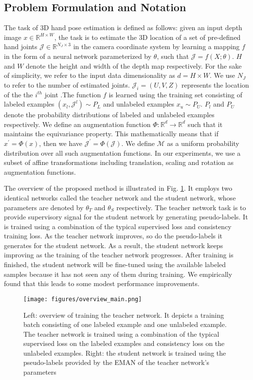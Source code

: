\documentclass{article}
\begin{document}
\subsection{Problem Formulation and Notation}
The task of 3D hand pose estimation is defined as follows: given an input depth image $x\in{\mathbb{R}^{H\times{W}}}$, the task is to estimate the 3D location of a set of pre-defined hand joints $\mathcal{J}\in{\mathbb{R}^{N_J\times{3}}}$ in the camera coordinate system by learning a mapping $f$ in the form of a neural network parameterized by $\theta$, such that $\mathcal{J} = f(X ;\theta)$. $H$ and $W$ denote the height and width of the depth map respectively. For the sake of simplicity, we refer to the input data dimensionality as $d = H\times{W}$. We use $N_J$ to refer to the number of estimated joints. $\mathcal{J}_i = (U,V,Z)$ represents the location of the the $i^{th}$ joint .The function $f$ is learned using the training set consisting of labeled examples $(x_l, \mathcal{J}^l) \sim P_L$  and unlabeled examples $x_u \sim P_U$. $P_l$ and $P_U$ denote the probability distributions of labeled and unlabeled examples respectively. We define an augmentation function $\Phi: \mathbb{R}^{d} \rightarrow{\mathbb{R}^{d}}$ such that it maintains the equivariance property. This mathematically means that if $x^{\prime} = \Phi(x)$, then we have $\mathcal{J}^{\prime} = \Phi(\mathcal{J})$. We define $\mathcal{M}$ as a uniform probability distribution over all such augmentation functions. In our experiments, we use a subset of affine transformations including translation, scaling and rotation as augmentation functions. 
\par
The overview of the proposed method is illustrated in Fig. \ref{fig:overview}. It employs two identical networks called the teacher network and the student network, whose parameters are denoted by $\theta_T$ and $\theta_S$ respectively. The teacher network task is to provide supervisory signal for the student network by generating pseudo-labels. It is trained using a combination of the typical supervised loss and consistency training loss. As the teacher network improves, so do the pseudo-labels it generates for the student network. As a result, the student network keeps improving as the training of the teacher network progresses. After training is finished, the student network will be fine-tuned using the available labeled samples because it has not seen any of them during training. We empirically found that this leads to some modest performance improvements.


\begin{figure}[t]
\centering
\texttt{[image: figures/overview\_main.png]}
\caption{Left: overview of training the teacher network. It depicts a training batch consisting of one labeled example and one unlabeled example. The teacher network is trained using a combination of the typical supervised loss on the labeled examples and consistency loss on the unlabeled examples. Right: the student network is trained using the pseudo-labels provided by the EMAN of the teacher network's parameters}
\label{fig:overview}
\end{figure}
\end{document}

